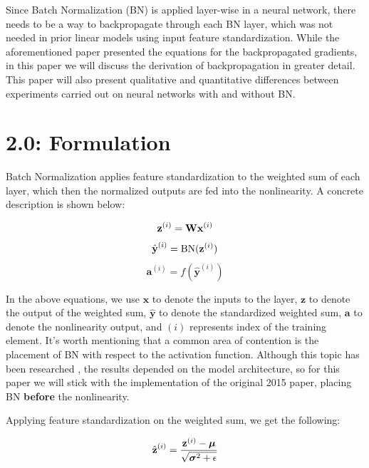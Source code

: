 \documentclass{article}
\begin{document}
\begin{multicols}{2}
Since Batch Normalization (BN) is applied layer-wise in a neural network, 
there needs to be a way to backpropagate through each BN layer, which 
was not needed in prior linear models using input feature standardization.
While the aforementioned paper presented the equations for the backpropagated
gradients, in this paper we will discuss the derivation of backpropagation
in greater detail. This paper will also present qualitative and quantitative
differences between experiments carried out on neural networks with 
and without BN.








\section*{2.0: Formulation}

Batch Normalization applies feature standardization to the weighted sum of 
each layer, which then the normalized outputs are fed into the nonlinearity.
A concrete description is shown below:

\begin{equation}
    \textbf{z}^{(i)} = \textbf{W}\textbf{x}^{(i)} \notag
\end{equation}
\begin{equation}
    \hat{\textbf{y}}^{(i)} = \text{BN}(\textbf{z}^{(i)}) \notag
\end{equation}
\begin{equation}
    \textbf{a}^{(i)} = f(\hat{\textbf{y}}^{(i)}) 
\end{equation}

In the above equations, we use $\textbf{x}$ to denote the inputs to the layer, 
$\textbf{z}$ to denote the output of the weighted sum, 
$\hat{\textbf{y}}$ to denote the standardized weighted sum,
$\textbf{a}$ to denote the nonlinearity output, and $(i)$ represents index 
of the training element.
It's worth mentioning that a common area of contention is the placement 
of BN with respect to the activation function. Although this topic 
has been researched \cite{bnplacement}, the results depended on the model architecture, 
so for this paper we will stick with the implementation of the 
original 2015 paper\cite{batchnorm}, placing BN \textbf{before} the nonlinearity.

Applying feature standardization on the weighted sum, we get the following:

\begin{equation}
    \hat{\textbf{z}}^{(i)} = {\textbf{z}^{(i)} - \boldsymbol{\mu}\over \sqrt{\boldsymbol{\sigma}^2 + \epsilon}} 
\end{equation}


\end{multicols}
\end{document}
